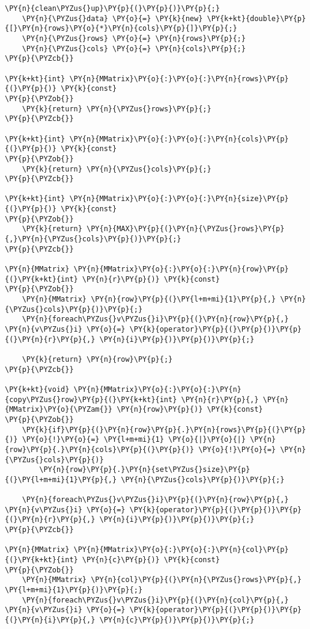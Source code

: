 \begin{Verbatim}[commandchars=\\\{\}]
	\PY{n}{clean\PYZus{}up}\PY{p}{(}\PY{p}{)}\PY{p}{;}
	\PY{n}{\PYZus{}data} \PY{o}{=} \PY{k}{new} \PY{k+kt}{double}\PY{p}{[}\PY{n}{rows}\PY{o}{*}\PY{n}{cols}\PY{p}{]}\PY{p}{;}
	\PY{n}{\PYZus{}rows} \PY{o}{=} \PY{n}{rows}\PY{p}{;}
	\PY{n}{\PYZus{}cols} \PY{o}{=} \PY{n}{cols}\PY{p}{;}
\PY{p}{\PYZcb{}}

\PY{k+kt}{int} \PY{n}{MMatrix}\PY{o}{:}\PY{o}{:}\PY{n}{rows}\PY{p}{(}\PY{p}{)} \PY{k}{const}
\PY{p}{\PYZob{}}
	\PY{k}{return} \PY{n}{\PYZus{}rows}\PY{p}{;}
\PY{p}{\PYZcb{}}

\PY{k+kt}{int} \PY{n}{MMatrix}\PY{o}{:}\PY{o}{:}\PY{n}{cols}\PY{p}{(}\PY{p}{)} \PY{k}{const}
\PY{p}{\PYZob{}}
	\PY{k}{return} \PY{n}{\PYZus{}cols}\PY{p}{;}
\PY{p}{\PYZcb{}}

\PY{k+kt}{int} \PY{n}{MMatrix}\PY{o}{:}\PY{o}{:}\PY{n}{size}\PY{p}{(}\PY{p}{)} \PY{k}{const}
\PY{p}{\PYZob{}}
	\PY{k}{return} \PY{n}{MAX}\PY{p}{(}\PY{n}{\PYZus{}rows}\PY{p}{,}\PY{n}{\PYZus{}cols}\PY{p}{)}\PY{p}{;}
\PY{p}{\PYZcb{}}

\PY{n}{MMatrix} \PY{n}{MMatrix}\PY{o}{:}\PY{o}{:}\PY{n}{row}\PY{p}{(}\PY{k+kt}{int} \PY{n}{r}\PY{p}{)} \PY{k}{const}
\PY{p}{\PYZob{}}
	\PY{n}{MMatrix} \PY{n}{row}\PY{p}{(}\PY{l+m+mi}{1}\PY{p}{,} \PY{n}{\PYZus{}cols}\PY{p}{)}\PY{p}{;}
	\PY{n}{foreach\PYZus{}v\PYZus{}i}\PY{p}{(}\PY{n}{row}\PY{p}{,} \PY{n}{v\PYZus{}i} \PY{o}{=} \PY{k}{operator}\PY{p}{(}\PY{p}{)}\PY{p}{(}\PY{n}{r}\PY{p}{,} \PY{n}{i}\PY{p}{)}\PY{p}{)}\PY{p}{;}

	\PY{k}{return} \PY{n}{row}\PY{p}{;}
\PY{p}{\PYZcb{}}

\PY{k+kt}{void} \PY{n}{MMatrix}\PY{o}{:}\PY{o}{:}\PY{n}{copy\PYZus{}row}\PY{p}{(}\PY{k+kt}{int} \PY{n}{r}\PY{p}{,} \PY{n}{MMatrix}\PY{o}{\PYZam{}} \PY{n}{row}\PY{p}{)} \PY{k}{const}
\PY{p}{\PYZob{}}
	\PY{k}{if}\PY{p}{(}\PY{n}{row}\PY{p}{.}\PY{n}{rows}\PY{p}{(}\PY{p}{)} \PY{o}{!}\PY{o}{=} \PY{l+m+mi}{1} \PY{o}{|}\PY{o}{|} \PY{n}{row}\PY{p}{.}\PY{n}{cols}\PY{p}{(}\PY{p}{)} \PY{o}{!}\PY{o}{=} \PY{n}{\PYZus{}cols}\PY{p}{)}
		\PY{n}{row}\PY{p}{.}\PY{n}{set\PYZus{}size}\PY{p}{(}\PY{l+m+mi}{1}\PY{p}{,} \PY{n}{\PYZus{}cols}\PY{p}{)}\PY{p}{;}

	\PY{n}{foreach\PYZus{}v\PYZus{}i}\PY{p}{(}\PY{n}{row}\PY{p}{,} \PY{n}{v\PYZus{}i} \PY{o}{=} \PY{k}{operator}\PY{p}{(}\PY{p}{)}\PY{p}{(}\PY{n}{r}\PY{p}{,} \PY{n}{i}\PY{p}{)}\PY{p}{)}\PY{p}{;}
\PY{p}{\PYZcb{}}

\PY{n}{MMatrix} \PY{n}{MMatrix}\PY{o}{:}\PY{o}{:}\PY{n}{col}\PY{p}{(}\PY{k+kt}{int} \PY{n}{c}\PY{p}{)} \PY{k}{const}
\PY{p}{\PYZob{}}
	\PY{n}{MMatrix} \PY{n}{col}\PY{p}{(}\PY{n}{\PYZus{}rows}\PY{p}{,} \PY{l+m+mi}{1}\PY{p}{)}\PY{p}{;}
	\PY{n}{foreach\PYZus{}v\PYZus{}i}\PY{p}{(}\PY{n}{col}\PY{p}{,} \PY{n}{v\PYZus{}i} \PY{o}{=} \PY{k}{operator}\PY{p}{(}\PY{p}{)}\PY{p}{(}\PY{n}{i}\PY{p}{,} \PY{n}{c}\PY{p}{)}\PY{p}{)}\PY{p}{;}


\end{Verbatim}

